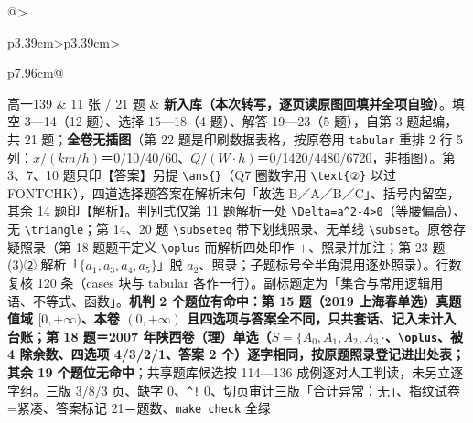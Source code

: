 \documentclass[a4paper,11pt]{article}
\begin{document}
\begin{xltabular}{\textwidth}{@{}>{\raggedright\arraybackslash}p{3.39cm}>{\centering\arraybackslash}p{3.39cm}>{\raggedright\arraybackslash}p{7.96cm}@{}}
高一139 & 11 张 / 21 题 & \textbf{新入库（本次转写，逐页读原图回填并全项自验）}。填空 3---14（12 题）、选择 15---18（4 题）、解答 19---23（5 题），自第 3 题起编，共 21 题；\textbf{全卷无插图}（第 22 题是印刷数据表格，按原卷用 \texttt{tabular} 重排 2 行 5 列：\(x/(km/h)\)＝0/10/40/60、\(Q/(W\cdot h)\)＝0/1420/4480/6720，非插图）。第 3、7、10 题只印【答案】另提 \texttt{\textbackslash{}ans\{\}}（Q7 圈数字用 \texttt{\textbackslash{}text\{②\}} 以过 FONTCHK），四道选择题答案在解析末句「故选 B／A／B／C」、括号内留空，其余 14 题印【解析】。判别式仅第 11 题解析一处 \texttt{\textbackslash{}Delta=a\^{}2-\allowbreak{}4\textgreater{}0}（等腰偏高）、无 \texttt{\textbackslash{}triangle}；第 14、20 题 \texttt{\textbackslash{}subseteq} 带下划线照录、无单线 \texttt{\textbackslash{}subset}。原卷存疑照录（第 18 题题干定义 \texttt{\textbackslash{}oplus} 而解析四处印作 \(+\allowbreak \)、照录并加注；第 23 题 (3)② 解析「\(\{a_1,a_3,a_4,a_5\}\)」脱 \(a_2\)、照录；子题标号全半角混用逐处照录）。行数复核 120 条（cases 块与 tabular 各作一行）。副标题定为「集合与常用逻辑用语、不等式、函数」。\textbf{机判 2 个题位有命中：第 15 题（2019 上海春单选）真题值域 \([0,\allowbreak +\allowbreak \infty)\)、本卷 \((0,\allowbreak +\allowbreak \infty)\) 且四选项与答案全不同，只共套话、记入未计入台账；第 18 题＝2007 年陕西卷（理）单选（\(S=\allowbreak \{A_0,A_1,A_2,A_3\}\)、\texttt{\textbackslash{}oplus}、被 4 除余数、四选项 4/3/2/1、答案 2 个）逐字相同，按原题照录登记进出处表；其余 19 个题位无命中}；共享题库候选按 114---136 成例逐对人工判读，未另立逐字组。三版 3/8/3 页、缺字 0、\texttt{\^{}!} 0、切页审计三版「合计异常：无」、指纹试卷=紧凑、答案标记 21＝题数、\texttt{make\ check} 全绿 \\ \addlinespace[1pt]

\end{xltabular}
\end{document}
